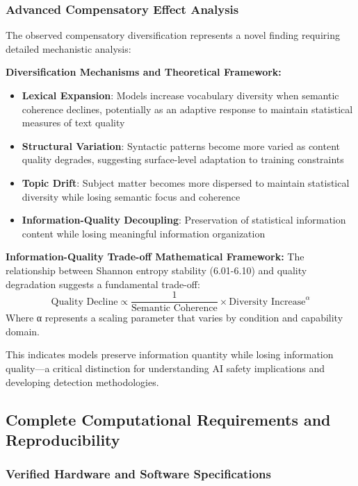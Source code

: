 \documentclass{article}
\begin{document}
\subsubsection{Advanced Compensatory Effect Analysis}

The observed compensatory diversification represents a novel finding requiring detailed mechanistic analysis:

\textbf{Diversification Mechanisms and Theoretical Framework:}
\begin{itemize}
    \item \textbf{Lexical Expansion}: Models increase vocabulary diversity when semantic coherence declines, potentially as an adaptive response to maintain statistical measures of text quality
    \item \textbf{Structural Variation}: Syntactic patterns become more varied as content quality degrades, suggesting surface-level adaptation to training constraints
    \item \textbf{Topic Drift}: Subject matter becomes more dispersed to maintain statistical diversity while losing semantic focus and coherence
    \item \textbf{Information-Quality Decoupling}: Preservation of statistical information content while losing meaningful information organization
\end{itemize}

\textbf{Information-Quality Trade-off Mathematical Framework:}
The relationship between Shannon entropy stability (6.01-6.10) and quality degradation suggests a fundamental trade-off:
\begin{equation}
\text{Quality Decline} \propto \frac{1}{\text{Semantic Coherence}} \times \text{Diversity Increase}^{\alpha}
\end{equation}
Where α represents a scaling parameter that varies by condition and capability domain.

This indicates models preserve information quantity while losing information quality—a critical distinction for understanding AI safety implications and developing detection methodologies.

\subsection{Complete Computational Requirements and Reproducibility}
\label{appendix:computational_requirements}

\subsubsection{Verified Hardware and Software Specifications}
\end{document}
